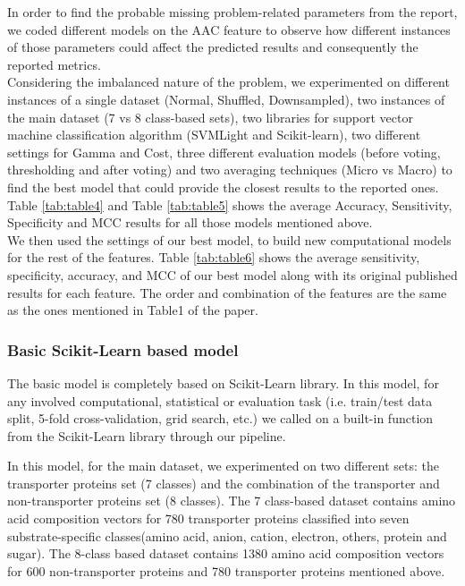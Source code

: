     In order to find the probable missing problem-related parameters from the report, 
    we coded different models on the AAC feature to observe how different instances of those 
    parameters could affect the predicted results and consequently the reported metrics.\\

    Considering the imbalanced nature of the problem, we experimented on different instances of 
    a single dataset (Normal, Shuffled, Downsampled), two instances of the main dataset (7 vs 8 class-based sets), 
    two libraries for support vector machine classification algorithm (SVMLight and Scikit-learn), two different settings 
    for Gamma and Cost, three different evaluation models (before voting, thresholding and after voting) and 
    two averaging techniques (Micro vs Macro) to find the best model that could provide the closest results to the reported ones. 
    Table \ref{tab:table4} and Table \ref{tab:table5} shows the average Accuracy, Sensitivity, Specificity and MCC 
    results for all those models mentioned above.\\

    We then used the settings of our best model, to build new computational models for the rest of the features. 
    Table \ref{tab:table6} shows the average sensitivity, specificity, accuracy, and MCC of our best model 
    along with its original published results for each feature. The order and combination of the features are the same 
    as the ones mentioned in Table1 of the paper.\\


    \subsubsection{Basic Scikit-Learn based model}
    The basic model is completely based on Scikit-Learn library. In this model, for any involved 
    computational, statistical or evaluation task (i.e. train/test data split, 5-fold cross-validation, grid search, etc.) 
    we called on a built-in function from the Scikit-Learn library through our pipeline.\\


    In this model, for the main dataset, we experimented on two different sets: the transporter proteins set 
    (7 classes) and the combination of the transporter and non-transporter proteins set (8 classes). 
    The 7 class-based dataset contains amino acid composition vectors for 780 transporter proteins classified into 
    seven substrate-specific classes(amino acid, anion, cation, electron, others, protein and sugar). 
    The 8-class based dataset contains 1380 amino acid composition vectors for 600 non-transporter proteins and 
    780 transporter proteins mentioned above.\\

